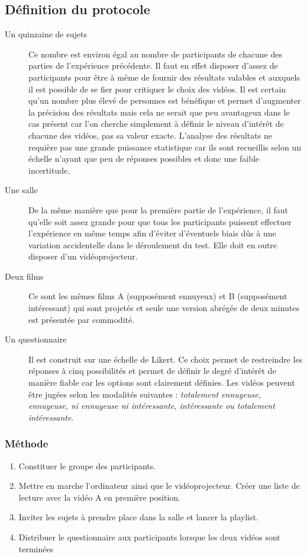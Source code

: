\documentclass[12pt,fleqn,oneside,french,openany]{book} %
\begin{document}
\subsection{Définition du protocole} \label{ssec:defProto1.2}
\begin{description}
	\item[Un quinzaine de sujets] Ce nombre est environ égal au nombre de participants de chacune des parties de l'expérience précédente. Il faut en effet disposer d'assez de participants pour être à même de fournir des résultats valables et auxquels il est possible de se fier pour critiquer le choix des vidéos. Il est certain qu'un nombre plus élevé de personnes est bénéfique et permet d'augmenter la précision des résultats mais cela ne serait que peu avantageux dans le cas présent car l'on cherche simplement à définir le niveau d'intérêt de chacune des vidéos, pas sa valeur exacte. L'analyse des résultats ne requière pas une grande puissance statistique car ils sont recueillis selon un échelle n'ayant que peu de réponses possibles et donc une faible incertitude.
	\item[Une salle] De la même manière que pour la première partie de l'expérience, il faut qu'elle soit assez grande pour que tous les participants puissent effectuer l'expérience en même temps afin d'éviter d'éventuels biais dûs à une variation accidentelle dans le déroulement du test. Elle doit en outre disposer d'un vidéoprojecteur.
	\item[Deux films] Ce sont les mêmes films A (supposément ennuyeux) et B (supposément intéressant) qui sont projetés et seule une version abrégée de deux minutes est présentée par commodité.
	\item[Un questionnaire] Il est construit sur une échelle de Likert. Ce choix permet de restreindre les réponses à cinq possibilités et permet de définir le degré d'intérêt de manière fiable car les options sont clairement définies. Les vidéos peuvent être jugées selon les modalités suivantes : \emph{totalement ennuyeuse, ennuyeuse, ni ennuyeuse ni intéressante, intéressante ou totalement intéressante}.
\end{description}

\subsubsection{Méthode} \label{sssec:methode1.2}
\begin{enumerate}
	\item Constituer le groupe des participants.
	\item Mettre en marche l'ordinateur ainsi que le vidéoprojecteur. Créer une liste de lecture avec la vidéo A en première position.
	\item Inviter les sujets à prendre place dans la salle et lancer la playlist.
	\item Distribuer le questionnaire aux participants lorsque les deux vidéos sont terminées
\end{enumerate}
\end{document}

